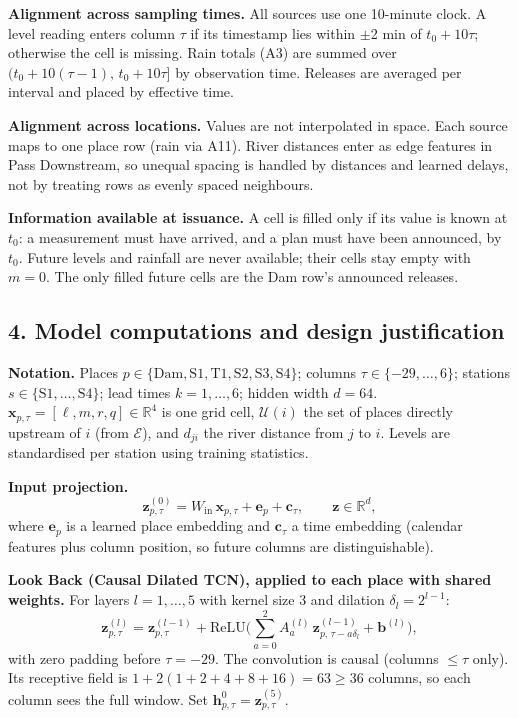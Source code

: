 \textbf{Alignment across sampling times.} All sources use one 10-minute clock. A level reading enters column $\tau$ if its timestamp lies within $\pm$2 min of $t_0+10\tau$; otherwise the cell is missing. Rain totals (A3) are summed over $(t_0+10(\tau-1),\,t_0+10\tau]$ by observation time. Releases are averaged per interval and placed by effective time.

\textbf{Alignment across locations.} Values are not interpolated in space. Each source maps to one place row (rain via A11). River distances enter as edge features in Pass Downstream, so unequal spacing is handled by distances and learned delays, not by treating rows as evenly spaced neighbours.

\textbf{Information available at issuance.} A cell is filled only if its value is known at $t_0$: a measurement must have arrived, and a plan must have been announced, by $t_0$. Future levels and rainfall are never available; their cells stay empty with $m=0$. The only filled future cells are the Dam row's announced releases.

\subsection*{4. Model computations and design justification}

\textbf{Notation.} Places $p\in\{\text{Dam},\text{S1},\text{T1},\text{S2},\text{S3},\text{S4}\}$; columns $\tau\in\{-29,\dots,6\}$; stations $s\in\{\text{S1},\dots,\text{S4}\}$; lead times $k=1,\dots,6$; hidden width $d=64$. $\mathbf x_{p,\tau}=[\ell,m,r,q]\in\mathbb R^4$ is one grid cell, $\mathcal U(i)$ the set of places directly upstream of $i$ (from $\mathcal E$), and $d_{ji}$ the river distance from $j$ to $i$. Levels are standardised per station using training statistics.

\textbf{Input projection.}
\begin{equation}
\mathbf z^{(0)}_{p,\tau} = W_{\text{in}}\,\mathbf x_{p,\tau} + \mathbf e_p + \mathbf c_\tau, \qquad \mathbf z\in\mathbb R^{d},
\end{equation}
where $\mathbf e_p$ is a learned place embedding and $\mathbf c_\tau$ a time embedding (calendar features plus column position, so future columns are distinguishable).

\textbf{Look Back (Causal Dilated TCN), applied to each place with shared weights.} For layers $l=1,\dots,5$ with kernel size 3 and dilation $\delta_l=2^{l-1}$:
\begin{equation}
\mathbf z^{(l)}_{p,\tau} = \mathbf z^{(l-1)}_{p,\tau} + \mathrm{ReLU}\Big(\textstyle\sum_{a=0}^{2} A^{(l)}_a\,\mathbf z^{(l-1)}_{p,\,\tau-a\delta_l} + \mathbf b^{(l)}\Big),
\end{equation}
with zero padding before $\tau=-29$. The convolution is causal (columns $\le\tau$ only). Its receptive field is $1+2(1+2+4+8+16)=63\ge36$ columns, so each column sees the full window. Set $\mathbf h^{0}_{p,\tau}=\mathbf z^{(5)}_{p,\tau}$.

